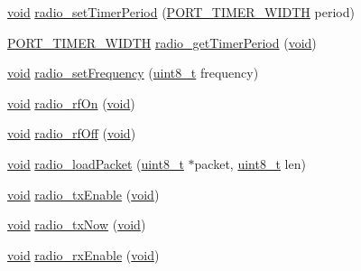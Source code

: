 \begin{DoxyCompactItemize}
\item 
\hyperlink{usb__devapi_8h_afabf60e7f57651d6d595a02c75f07cd0}{void} \hyperlink{group__radio_gaef86051d9ade0d9bd75070237447f83c}{radio\+\_\+set\+Timer\+Period} (\hyperlink{z1_2board__info_8h_abe66b9c1c60db84f2a99f2b827275f24}{P\+O\+R\+T\+\_\+\+T\+I\+M\+E\+R\+\_\+\+W\+I\+D\+TH} period)
\item 
\hyperlink{z1_2board__info_8h_abe66b9c1c60db84f2a99f2b827275f24}{P\+O\+R\+T\+\_\+\+T\+I\+M\+E\+R\+\_\+\+W\+I\+D\+TH} \hyperlink{group__radio_ga7845450951762209c4879ad10bf160e6}{radio\+\_\+get\+Timer\+Period} (\hyperlink{usb__devapi_8h_afabf60e7f57651d6d595a02c75f07cd0}{void})
\item 
\hyperlink{usb__devapi_8h_afabf60e7f57651d6d595a02c75f07cd0}{void} \hyperlink{group__radio_gaa062a57421da7b960a2613e4f65d3a11}{radio\+\_\+set\+Frequency} (\hyperlink{_p_e___types_8h_aba7bc1797add20fe3efdf37ced1182c5}{uint8\+\_\+t} frequency)
\item 
\hyperlink{usb__devapi_8h_afabf60e7f57651d6d595a02c75f07cd0}{void} \hyperlink{group__radio_gac01e153ff02faec0d39efa095d6e5837}{radio\+\_\+rf\+On} (\hyperlink{usb__devapi_8h_afabf60e7f57651d6d595a02c75f07cd0}{void})
\item 
\hyperlink{usb__devapi_8h_afabf60e7f57651d6d595a02c75f07cd0}{void} \hyperlink{group__radio_gaebe8cf9401340cd8bfaabfb8e465a0e9}{radio\+\_\+rf\+Off} (\hyperlink{usb__devapi_8h_afabf60e7f57651d6d595a02c75f07cd0}{void})
\item 
\hyperlink{usb__devapi_8h_afabf60e7f57651d6d595a02c75f07cd0}{void} \hyperlink{group__radio_ga9adb1e30e5a3aaed77829b231e54700e}{radio\+\_\+load\+Packet} (\hyperlink{_p_e___types_8h_aba7bc1797add20fe3efdf37ced1182c5}{uint8\+\_\+t} $\ast$packet, \hyperlink{_p_e___types_8h_aba7bc1797add20fe3efdf37ced1182c5}{uint8\+\_\+t} len)
\item 
\hyperlink{usb__devapi_8h_afabf60e7f57651d6d595a02c75f07cd0}{void} \hyperlink{group__radio_ga23b8b3278db30bc9cec95510b584b3c7}{radio\+\_\+tx\+Enable} (\hyperlink{usb__devapi_8h_afabf60e7f57651d6d595a02c75f07cd0}{void})
\item 
\hyperlink{usb__devapi_8h_afabf60e7f57651d6d595a02c75f07cd0}{void} \hyperlink{group__radio_ga913f5f6cecb9bdde24278b4692850888}{radio\+\_\+tx\+Now} (\hyperlink{usb__devapi_8h_afabf60e7f57651d6d595a02c75f07cd0}{void})
\item 
\hyperlink{usb__devapi_8h_afabf60e7f57651d6d595a02c75f07cd0}{void} \hyperlink{group__radio_ga61f398fe7a5d131ef2d30e2d09424705}{radio\+\_\+rx\+Enable} (\hyperlink{usb__devapi_8h_afabf60e7f57651d6d595a02c75f07cd0}{void})

\end{DoxyCompactItemize}

